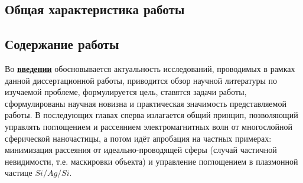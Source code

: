 
\subsection*{Общая характеристика работы}

\newcommand{\actuality}{\underline{\textbf{\actualityTXT}}}
\newcommand{\progress}{\underline{\textbf{\progressTXT}}}
\newcommand{\aim}{\underline{{\textbf\aimTXT}}}
\newcommand{\tasks}{\underline{\textbf{\tasksTXT}}}
\newcommand{\novelty}{\underline{\textbf{\noveltyTXT}} }
\newcommand{\influence}{\underline{\textbf{\influenceTXT}}}
\newcommand{\methods}{\underline{\textbf{\methodsTXT}}}
\newcommand{\defpositions}{\underline{\textbf{\defpositionsTXT}}}
\newcommand{\reliability}{\underline{\textbf{\reliabilityTXT}}}
\newcommand{\probation}{\underline{\textbf{\probationTXT}}}
\newcommand{\contribution}{\underline{\textbf{\contributionTXT}}}
\newcommand{\publications}{\underline{\textbf{\publicationsTXT}}}




\subsection*{Содержание работы}
Во \underline{\textbf{введении}} обосновывается актуальность
исследований, проводимых в рамках данной диссертационной работы,
приводится обзор научной литературы по изучаемой проблеме,
формулируется цель, ставятся задачи работы, сформулированы научная
новизна и практическая значимость представляемой работы. В последующих
главах сперва излагается общий принцип, позволяющий управлять
поглощением и рассеянием электромагнитных волн от многослойной
сферической наночастицы, а потом идёт апробация на частных примерах:
минимизация рассеяния от идеально-проводящей сферы (случай частичной
невидимости, т.е. маскировки объекта) и управление поглощением в плазмонной
частице $Si/Ag/Si$.


